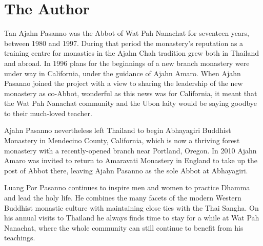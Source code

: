 \dividerRule

\section{The Author}

Tan Ajahn Pasanno was the Abbot of Wat Pah Nanachat for seventeen
years, between 1980 and 1997. During that period the monastery's
reputation as a training centre for monastics in the Ajahn Chah
tradition grew both in Thailand and abroad. In 1996 plans for the
beginnings of a new branch monastery were under way in California, under
the guidance of Ajahn Amaro. When Ajahn Pasanno joined the project with
a view to sharing the leadership of the new monastery as co-Abbot, 
wonderful as this news was for California, it meant that the Wat Pah
Nanachat community and the Ubon laity would be saying goodbye to their
much-loved teacher.

Ajahn Pasanno nevertheless left Thailand to begin Abhayagiri Buddhist
Monastery in Mendecino County, California, which is now a thriving
forest monastery with a recently-opened branch near Portland, Oregon. In
2010 Ajahn Amaro was invited to return to Amaravati Monastery in England
to take up the post of Abbot there, leaving Ajahn Pasanno as the sole
Abbot at Abhayagiri. 

Luang Por Pasanno continues to inspire men and women to practice
Dhamma and lead the holy life. He combines the many facets of the modern
Western Buddhist monastic culture with maintaining close ties with the
Thai Sangha. On his annual visits to Thailand he always finds time to
stay for a while at Wat Pah Nanachat, where the whole community can
still continue to benefit from his teachings.

